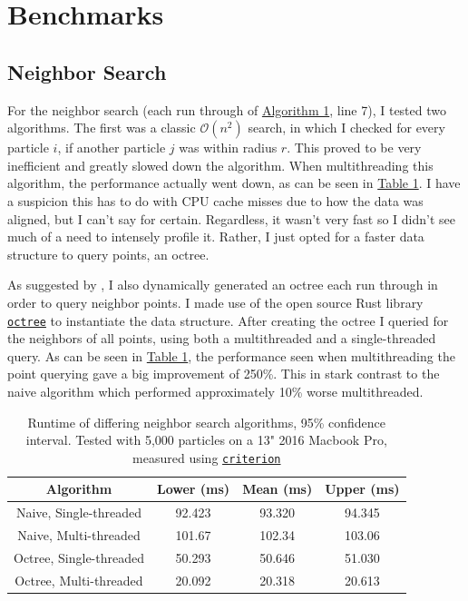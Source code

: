 \documentclass[sigplan,screen]{acmart}
\begin{document}
\section{Benchmarks}
\label{sec:benchmarks}
\subsection{Neighbor Search}
For the neighbor search (each run through of \hyperref[alg:cpu]{Algorithm 1}, line 7), I tested two algorithms. The first was a classic $\mathcal{O}(n^2)$ search, in which I checked for every particle $i$, if another particle $j$ was within radius $r$. This proved to be very inefficient and greatly slowed down the algorithm. When multithreading this algorithm, the performance actually went down, as can be seen in \hyperref[tab:runtimes]{Table 1}. I have a suspicion this has to do with CPU cache misses \cite{Meyers} due to how the data was aligned, but I can't say for certain. Regardless, it wasn't very fast so I didn't see much of a need to intensely profile it. Rather, I just opted for a faster data structure to query points, an octree.

As suggested by \cite{Muller}, I also dynamically generated an octree each run through in order to query neighbor points. I made use of the open source Rust library \href{https://docs.rs/octree/latest/octree/}{\texttt{octree}} to instantiate the data structure. After creating the octree I queried for the neighbors of all points, using both a multithreaded and a single-threaded query. As can be seen in \hyperref[tab:runtimes]{Table 1}, the performance seen when multithreading the point querying gave a big improvement of 250\%. This in stark contrast to the naive algorithm which performed approximately 10\% worse multithreaded.

\begin{table}
  \caption{Runtime of differing neighbor search algorithms, 95\% confidence interval. Tested with 5,000 particles on a 13" 2016 Macbook Pro, measured using \href{https://docs.rs/criterion/latest/criterion/}{\texttt{criterion}}}
  \label{tab:runtimes}
  \begin{tabular}{c|ccc}
    \toprule
    Algorithm &Lower (ms) &Mean (ms) &Upper (ms)\\
    \midrule
    Naive, Single-threaded &92.423 &93.320 &94.345\\
    Naive, Multi-threaded &101.67 &102.34 &103.06\\
    Octree, Single-threaded &50.293 &50.646 &51.030\\
    Octree, Multi-threaded &20.092 &20.318 &20.613\\
  \bottomrule
\end{tabular}
\end{table}
\end{document}
